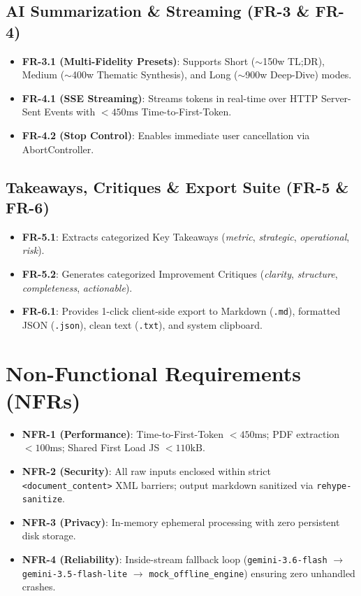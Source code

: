 \documentclass[10pt,twocolumn,a4paper]{article}
\begin{document}
\subsection{AI Summarization \& Streaming (FR-3 \& FR-4)}
\begin{itemize}[noitemsep]
    \item \textbf{FR-3.1 (Multi-Fidelity Presets)}: Supports Short ($\sim$150w TL;DR), Medium ($\sim$400w Thematic Synthesis), and Long ($\sim$900w Deep-Dive) modes.
    \item \textbf{FR-4.1 (SSE Streaming)}: Streams tokens in real-time over HTTP Server-Sent Events with $< 450\text{ms}$ Time-to-First-Token.
    \item \textbf{FR-4.2 (Stop Control)}: Enables immediate user cancellation via AbortController.
\end{itemize}

\subsection{Takeaways, Critiques \& Export Suite (FR-5 \& FR-6)}
\begin{itemize}[noitemsep]
    \item \textbf{FR-5.1}: Extracts categorized Key Takeaways (\textit{metric}, \textit{strategic}, \textit{operational}, \textit{risk}).
    \item \textbf{FR-5.2}: Generates categorized Improvement Critiques (\textit{clarity}, \textit{structure}, \textit{completeness}, \textit{actionable}).
    \item \textbf{FR-6.1}: Provides 1-click client-side export to Markdown (\texttt{.md}), formatted JSON (\texttt{.json}), clean text (\texttt{.txt}), and system clipboard.
\end{itemize}

\section{Non-Functional Requirements (NFRs)}
\begin{itemize}[noitemsep]
    \item \textbf{NFR-1 (Performance)}: Time-to-First-Token $< 450\text{ms}$; PDF extraction $< 100\text{ms}$; Shared First Load JS $< 110\text{kB}$.
    \item \textbf{NFR-2 (Security)}: All raw inputs enclosed within strict \texttt{<document\_content>} XML barriers; output markdown sanitized via \texttt{rehype-sanitize}.
    \item \textbf{NFR-3 (Privacy)}: In-memory ephemeral processing with zero persistent disk storage.
    \item \textbf{NFR-4 (Reliability)}: Inside-stream fallback loop (\texttt{gemini-3.6-flash} $\rightarrow$ \texttt{gemini-3.5-flash-lite} $\rightarrow$ \texttt{mock\_offline\_engine}) ensuring zero unhandled crashes.
\end{itemize}
\end{document}
